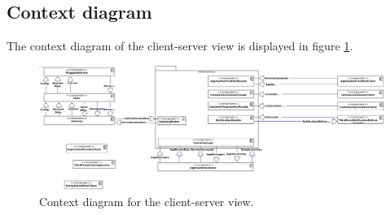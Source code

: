 

\begin{landscape}
    \section{Context diagram}
    The context diagram of the client-server view is displayed in figure \ref{fig:cc-context}. \\

    \centering
    \vspace*{\fill}

    \begin{figure}[!htp]
        \centering
        \includegraphics[width=\linewidth]{images/component-CONTEXT}
        \caption{Context diagram for the client-server view.}\label{fig:cc-context}
    \end{figure}

    \vfill
\end{landscape}


